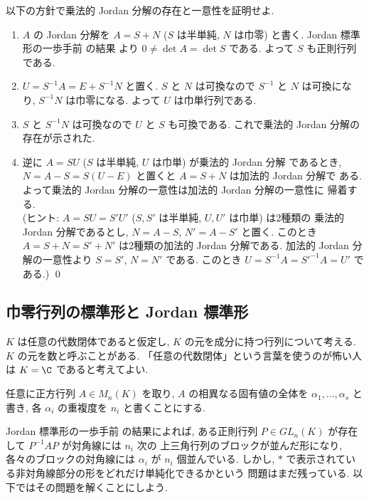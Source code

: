 \documentclass[12pt,twoside]{jarticle}
\begin{document}
\begin{question}
  以下の方針で乗法的 Jordan 分解の存在と一意性を証明せよ.
  \begin{enumerate}
  \item $A$ の Jordan 分解を $A = S + N$ ($S$ は半単純, $N$ は巾零) と書く.
    Jordan 標準形の一歩手前  の結果
    より $0\ne\det A=\det S$ である.  よって $S$ も正則行列である.
  \item $U=S^{-1}A=E+S^{-1}N$ と置く. 
    $S$ と $N$ は可換なので $S^{-1}$ と $N$ は可換になり,
    $S^{-1}N$ は巾零になる. よって $U$ は巾単行列である.
  \item $S$ と $S^{-1}N$ は可換なので $U$ と $S$ も可換である. 
    これで乗法的 Jordan 分解の存在が示された.
  \item 逆に $A=SU$ ($S$ は半単純, $U$ は巾単) が乗法的 Jordan 分解
    であるとき, $N=A-S=S(U-E)$ と置くと $A=S+N$ は加法的 Jordan 分解で
    ある.  よって乗法的 Jordan 分解の一意性は加法的 Jordan 分解の一意性に
    帰着する.
    \\(ヒント: $A=SU=S'U'$ ($S,S'$ は半単純, $U,U'$ は巾単) は2種類の
    乗法的 Jordan 分解であるとし, $N=A-S$, $N'=A-S'$ と置く.
    このとき $A=S+N=S'+N'$ は2種類の加法的 Jordan 分解である.
    加法的 Jordan 分解の一意性より $S=S'$, $N=N'$ である.
    このとき $U=S^{-1}A={S'}^{-1}A=U'$ である.)
    \qed
  \end{enumerate}
\end{question}


\subsection{巾零行列の標準形と Jordan 標準形}
\label{sec:Jordan-normal-form}

$K$ は任意の代数閉体であると仮定し, $K$ の元を成分に持つ行列について考える.
$K$ の元を数と呼ぶことがある. 「任意の代数閉体」という言葉を使うのが怖い人
は $K=\C$ であると考えてよい.

\medskip

任意に正方行列 $A\in M_n(K)$ を取り, 
$A$ の相異なる固有値の全体を $\alpha_1,\dots,\alpha_s$ と書き,
各 $\alpha_i$ の重複度を $n_i$ と書くことにする.

Jordan 標準形の一歩手前  の結果によれば, 
ある正則行列 $P\in GL_n(K)$ が存在して $P^{-1}AP$ が対角線には $n_i$ 次の
上三角行列のブロックが並んだ形になり, 
各々のブロックの対角線には $\alpha_i$ が $n_i$ 個並んでいる.
しかし,  $*$ で表示されている非対角線部分の形をどれだけ単純化できるかという
問題はまだ残っている.  以下ではその問題を解くことにしよう.
\end{document}
